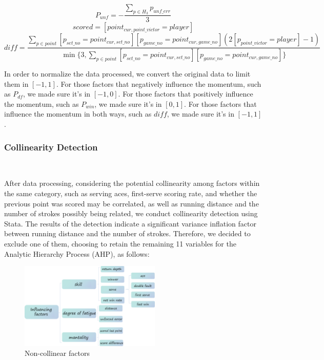 \begin{equation}
    P_{unf} = -\frac{\sum_{p \in H_3} p_{unf\_err}}{3}
\end{equation}
\begin{equation}
    scored = [point_{cur, point\_victor} = player]
\end{equation}
\begin{equation}
    diff = \frac{\sum_{p \in point}[p_{set\_no} = point_{cur, set\_no}][p_{game\_no} = point_{cur, game\_no}](2[p_{point\_victor} = player]-1)}{\min\{3, \sum_{p \in point}[p_{set\_no} = point_{cur, set\_no}][p_{game\_no} = point_{cur, game\_no}]\}}
\end{equation}

\par In order to normalize the data processed, we convert the original data to limit them in $[-1, 1]$. 
For those factors that negatively influence the momentum, such as $P_{df}$, we made sure it's in $[-1, 0]$. For those factors that positively influence the momentum, such as $P_{win}$, we made sure it's in $[0, 1]$. For those factors that influence the momentum in both ways, such as $diff$, we made sure it's in $[-1, 1]$.

\subsubsection{Collinearity Detection}~{}

After data processing, considering the potential collinearity among factors within the same category,
such as serving aces, first-serve scoring rate, and whether the previous point was scored may 
be correlated, as well as running distance and the number of strokes possibly being related, 
we conduct collinearity detection using Stata. The results of the detection indicate a
significant variance inflation factor between running distance and the number of strokes. 
Therefore, we decided to exclude one of them, choosing to retain the remaining 11 variables 
for the Analytic Hierarchy Process (AHP), as follows:

\begin{figure}[H]
    \centering
    \includegraphics[width=0.6\textwidth]{mainmatter/imgs/11.png}
    \caption{Non-collinear factors}
    \label{fig:11var}
\end{figure}


